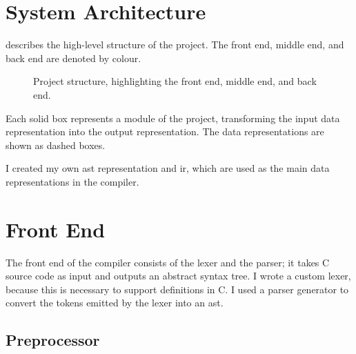 \documentclass[00-main.tex]{subfiles}
\begin{document}
\section{System Architecture}

 describes the high-level structure of the project. The \textcolor{frontendcolor}{front end}, \textcolor{middleendcolor}{middle end}, and \textcolor{backendcolor}{back end} are denoted by colour.

\begin{figure}[H]
  \centering
  \caption{Project structure, highlighting the \textcolor{frontendcolor}{front end}, \textcolor{middleendcolor}{middle end}, and \textcolor{backendcolor}{back end}.}
  \label{fig:project flowchart}
\end{figure}

Each solid box represents a module of the project, transforming the input data representation into the output representation.
The data representations are shown as dashed boxes.

I created my own \gls{ast} representation and \gls{ir}, which are used as the main data representations in the compiler.


\section{Front End}


The front end of the compiler consists of the lexer and the parser; it takes C source code as input and outputs an abstract syntax tree.
I wrote a custom lexer, because this is necessary to support  definitions in C\@.
I used a parser generator to convert the tokens emitted by the lexer into an \gls{ast}\@.

\subsection{Preprocessor}
\end{document}
